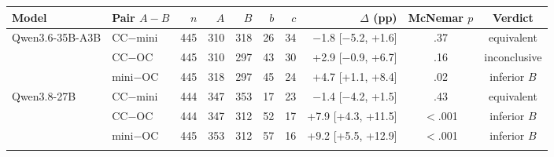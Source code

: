 \footnotesize\setlength{\tabcolsep}{3.5pt}
\begin{tabular}{@{}llrrrrrrcc@{}}
\toprule
Model & Pair $A-B$ & $n$ & $A$ & $B$ & $b$ & $c$ & $\Delta$ (pp) & McNemar $p$ & Verdict \\
\midrule
Qwen3.6-35B-A3B & CC$-$mini & 445 & 310 & 318 & 26 & 34 & $-$1.8 [$-$5.2, +1.6] & .37 & equivalent \\
 & CC$-$OC & 445 & 310 & 297 & 43 & 30 & +2.9 [$-$0.9, +6.7] & .16 & inconclusive \\
 & mini$-$OC & 445 & 318 & 297 & 45 & 24 & +4.7 [+1.1, +8.4] & .02 & inferior $B$ \\
\addlinespace
Qwen3.8-27B & CC$-$mini & 444 & 347 & 353 & 17 & 23 & $-$1.4 [$-$4.2, +1.5] & .43 & equivalent \\
 & CC$-$OC & 444 & 347 & 312 & 52 & 17 & +7.9 [+4.3, +11.5] & $<$.001 & inferior $B$ \\
 & mini$-$OC & 445 & 353 & 312 & 57 & 16 & +9.2 [+5.5, +12.9] & $<$.001 & inferior $B$ \\
\addlinespace
\bottomrule
\end{tabular}
